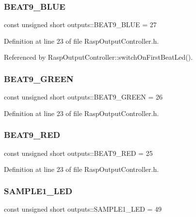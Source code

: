 \subsubsection{\texorpdfstring{B\+E\+A\+T9\+\_\+\+B\+L\+UE}{BEAT9\_BLUE}}
{\footnotesize\ttfamily const unsigned short outputs\+::\+B\+E\+A\+T9\+\_\+\+B\+L\+UE = 27}



Definition at line 23 of file Rasp\+Output\+Controller.\+h.



Referenced by Rasp\+Output\+Controller\+::switch\+On\+First\+Beat\+Led().

\mbox{\label{namespaceoutputs_a0600b91e575643cfee3eb9e9e5b14839}} 
\subsubsection{\texorpdfstring{B\+E\+A\+T9\+\_\+\+G\+R\+E\+EN}{BEAT9\_GREEN}}
{\footnotesize\ttfamily const unsigned short outputs\+::\+B\+E\+A\+T9\+\_\+\+G\+R\+E\+EN = 26}



Definition at line 23 of file Rasp\+Output\+Controller.\+h.

\mbox{\label{namespaceoutputs_a57a4d2c831b8b263bc763032afddaa03}} 
\subsubsection{\texorpdfstring{B\+E\+A\+T9\+\_\+\+R\+ED}{BEAT9\_RED}}
{\footnotesize\ttfamily const unsigned short outputs\+::\+B\+E\+A\+T9\+\_\+\+R\+ED = 25}



Definition at line 23 of file Rasp\+Output\+Controller.\+h.

\mbox{\label{namespaceoutputs_a151156390f60151968f4092740d9d6b8}} 
\subsubsection{\texorpdfstring{S\+A\+M\+P\+L\+E1\+\_\+\+L\+ED}{SAMPLE1\_LED}}
{\footnotesize\ttfamily const unsigned short outputs\+::\+S\+A\+M\+P\+L\+E1\+\_\+\+L\+ED = 49}



